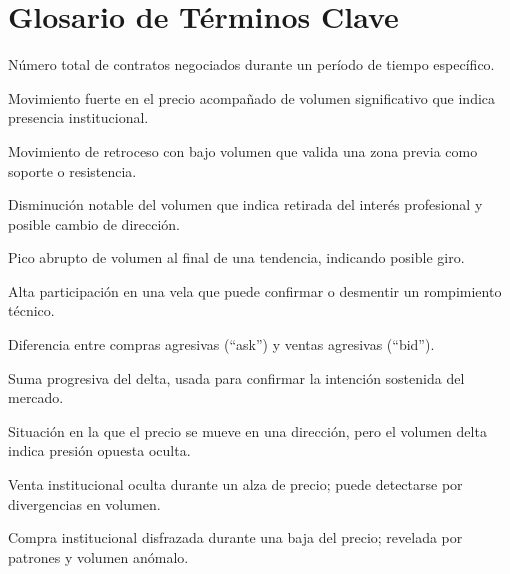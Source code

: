 \section*{Glosario de T\'erminos Clave}

\begin{description}[style=nextline]
  \sloppy
  \item[Volumen] N\'umero total de contratos negociados durante un per\'iodo de tiempo espec\'ifico.
  \item[Intenci\'on] Movimiento fuerte en el precio acompa\~nado de volumen significativo que indica presencia institucional.
  \item[Testeo] Movimiento de retroceso con bajo volumen que valida una zona previa como soporte o resistencia.
  \item[Secado] Disminuci\'on notable del volumen que indica retirada del inter\'es profesional y posible cambio de direcci\'on.
  \item[Volumen de parada] Pico abrupto de volumen al final de una tendencia, indicando posible giro.
  \item[Volumen m\'aximo] Alta participaci\'on en una vela que puede confirmar o desmentir un rompimiento t\'ecnico.
  \item[Volumen delta] Diferencia entre compras agresivas (``ask'') y ventas agresivas (``bid'').
  \item[Delta acumulado] Suma progresiva del delta, usada para confirmar la intenci\'on sostenida del mercado.
  \item[Absorci\'on] Situaci\'on en la que el precio se mueve en una direcci\'on, pero el volumen delta indica presi\'on opuesta oculta.
  \item[Distribuci\'on] Venta institucional oculta durante un alza de precio; puede detectarse por divergencias en volumen.
  \item[Acumulaci\'on] Compra institucional disfrazada durante una baja del precio; revelada por patrones y volumen an\'omalo.
\end{description}